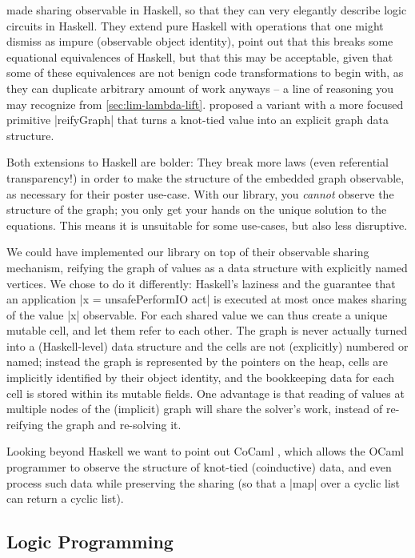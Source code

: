 \documentclass[manuscript,screen,acmsmall,nonacm]{acmart}
\begin{document}
 made sharing observable in Haskell, so that they can very elegantly describe logic circuits in Haskell. They extend pure Haskell with operations that one might dismiss as impure (observable object identity), point out that this breaks some equational equivalences of Haskell, but that this may be acceptable, given that some of these equivalences  are not benign code transformations to begin with, as they can duplicate arbitrary amount of work anyways -- a line of reasoning you may recognize from \cref{sec:lim-lambda-lift}.  proposed a variant with a more focused primitive |reifyGraph| that turns a knot-tied value into an explicit graph data structure.

Both extensions to Haskell are bolder: They break more laws (even referential transparency!) in order to make the structure of the embedded graph observable, as necessary for their poster use-case. With our library, you \emph{cannot} observe the structure of the graph; you only get your hands on the unique solution to the equations. This means it is unsuitable for some use-cases, but also less disruptive.

We could have implemented our library on top of their observable sharing mechanism, reifying the graph of values as a data structure with explicitly named vertices. We chose to do it differently: Haskell's laziness and the guarantee that an application |x = unsafePerformIO act| is executed at most once makes sharing of the value |x| observable. For each shared value we can thus create a unique mutable cell, and let them refer to each other.
The graph is never actually turned into a (Haskell-level) data structure and the cells are not (explicitly) numbered or named; instead the graph is represented by the pointers on the heap, cells are implicitly identified by their object identity, and the bookkeeping data for each cell is stored within its mutable fields. One advantage is that reading of values at multiple nodes of the (implicit) graph will share the solver's work, instead of re-reifying the graph and re-solving it.

Looking beyond Haskell we want to point out CoCaml \citep{cocaml}, which allows the OCaml programmer to observe the structure of knot-tied (coinductive) data, and even process such data while preserving the sharing (so that a |map| over a cyclic list can return a cyclic list).


\subsection{Logic Programming}
\end{document}
